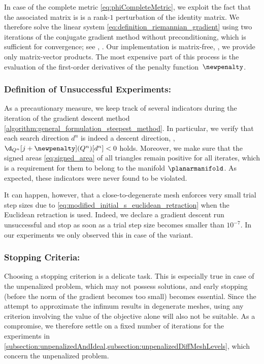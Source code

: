 In case of the complete metric \eqref{eq:phiCompleteMetric}, we exploit the fact that the associated matrix is is a rank-$1$ perturbation of the identity matrix.
We therefore solve the linear system \eqref{eq:definition_riemannian_gradient} using two iterations of the conjugate gradient method without preconditioning, which is sufficient for convergence; see \eg, \cite[eq.~(2.11), p.76]{ElmanSilvesterWathen:2014:1}.
Our implementation is matrix-free, \ie, we provide only matrix-vector products.
The most expensive part of this process is the evaluation of the first-order derivatives of the penalty function~$\newpenalty$.


\subsubsection*{Definition of Unsuccessful Experiments:}
As a precautionary measure, we keep track of several indicators during the iteration of the gradient descent method \cref{algorithm:general_formulation_steepest_method}.
In particular, we verify that each search direction $d^n$ is indeed a descent direction, \ie, $\d_{Q^n} [j + \newpenalty](Q^n)[d^n] < 0$ holds.
Moreover, we make sure that the signed areas \eqref{eq:signed_area} of all triangles remain positive for all iterates, which is a requirement for them to belong to the manifold $\planarmanifold$.
As expected, these indicators were never found to be violated.

It can happen, however, that a close-to-degenerate mesh enforces very small trial step sizes due to \eqref{eq:modified_initial_s_euclidean_retraction} when the Euclidean retraction is used.
Indeed, we declare a gradient descent run unsuccessful and stop as soon as a trial step size becomes smaller than $10^{-7}$.
In our experiments we only observed this in case of the \EucEuc variant.


\subsubsection*{Stopping Criteria:}
Choosing a stopping criterion is a delicate task.
This is especially true in case of the unpenalized problem, which may not possess solutions, and early stopping (before the norm of the gradient becomes too small) becomes essential.
Since the attempt to approximate the infimum results in degenerate meshes, using any criterion involving the value of the objective alone will also not be suitable.
As a compromise, we therefore settle on a fixed number of iterations for the experiments in \cref{subsection:unpenalizedAndIdeal,subsection:unpenalizedDiffMeshLevels}, which concern the unpenalized problem.

